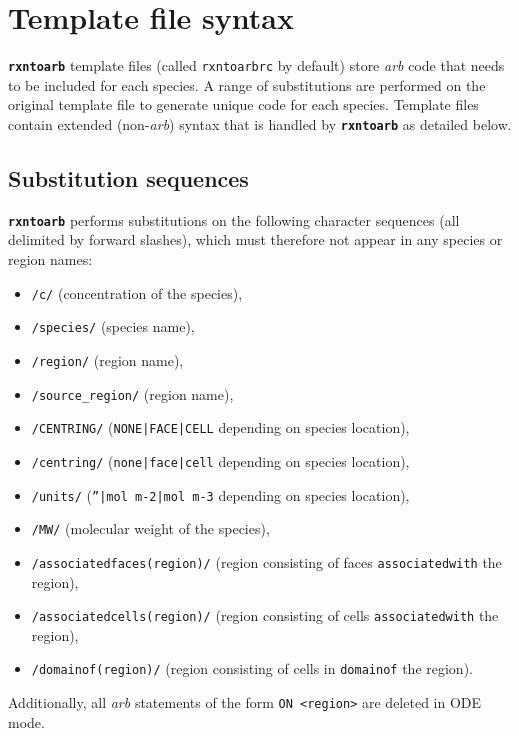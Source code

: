 \documentclass[fontsize=12pt,
               captions=abovetable,
               numbers=noenddot,
              ]{scrartcl}
\newcommand{\rxntoarb}{\texttt{\textbf{rxntoarb}}}
\newcommand{\syntax}[2]{\textcolor{#1}{\texttt{#2}}}
\begin{document}
\section{Template file syntax \label{s:templates}}

\rxntoarb{} template files (called \texttt{rxntoarbrc} by default) store \emph{arb} code that needs to be included for each species. A range of substitutions are performed on the original template file to generate unique code for each species. Template files contain extended (non-\emph{arb}) syntax that is handled by \rxntoarb{} as detailed below.

\subsection{Substitution sequences}

\rxntoarb{} performs substitutions on the following character sequences (all delimited by forward slashes), which must therefore not appear in any species or region names:
\begin{itemize}
\item \syntax{subs}{/c/} (concentration of the species),
\item \syntax{subs}{/species/} (species name),
\item \syntax{subs}{/region/} (region name),
\item \syntax{subs}{/source\_region/} (region name),
\item \syntax{subs}{/CENTRING/} (\texttt{NONE|FACE|CELL} depending on species location),
\item \syntax{subs}{/centring/} (\texttt{none|face|cell} depending on species location),
\item \syntax{subs}{/units/} (\texttt{''|mol m-2|mol m-3} depending on species location),
\item \syntax{subs}{/MW/} (molecular weight of the species),
\item \syntax{subs}{/associatedfaces(region)/} (region consisting of faces \texttt{associatedwith} the region),
\item \syntax{subs}{/associatedcells(region)/} (region consisting of cells \texttt{associatedwith} the region),
\item \syntax{subs}{/domainof(region)/} (region consisting of cells in \texttt{domainof} the region).
\end{itemize}
Additionally, all \emph{arb} statements of the form \texttt{ON <region>} are deleted in ODE mode.
\end{document}
